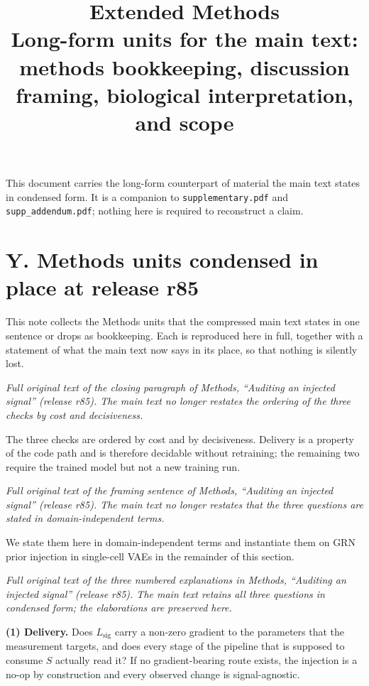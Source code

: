 \documentclass[11 pt,a4 paper]{article}
\title{\textbf{Extended Methods}\\[0.3 em]
\large Long-form units for the main text: methods bookkeeping, discussion framing, biological interpretation, and scope}
\author{}
\date{}
\begin{document}
\maketitle

\noindent This document carries the long-form counterpart of material the main text states in condensed form. It is a companion to \texttt{supplementary.pdf} and \texttt{supp\_addendum.pdf}; nothing here is required to reconstruct a claim.

\section*{Y. Methods units condensed in place at release r85}

This note collects the Methods units that the compressed main text states in one sentence or drops as bookkeeping. Each is reproduced here in full, together with a statement of what the main text now says in its place, so that nothing is silently lost.

\noindent\emph{Full original text of the closing paragraph of Methods, ``Auditing an injected signal'' (release r85). The main text no longer restates the ordering of the three checks by cost and decisiveness.}

The three checks are ordered by cost and by decisiveness. Delivery is a property
of the code path and is therefore decidable without retraining; the remaining two
require the trained model but not a new training run.

\noindent\emph{Full original text of the framing sentence of Methods, ``Auditing an injected signal'' (release r85). The main text no longer restates that the three questions are stated in domain-independent terms.}

We state them here in
domain-independent terms and instantiate them on GRN prior injection in
single-cell VAEs in the remainder of this section.

\noindent\emph{Full original text of the three numbered explanations in Methods, ``Auditing an injected signal'' (release r85). The main text retains all three questions in condensed form; the elaborations are preserved here.}

\textbf{(1) Delivery.} Does $L_{\text{sig}}$ carry a non-zero gradient to the
parameters that the measurement targets, and does every stage of the pipeline
that is supposed to consume $S$ actually read it? If no gradient-bearing route
exists, the injection is a no-op by construction and every observed change is
signal-agnostic.
\end{document}
